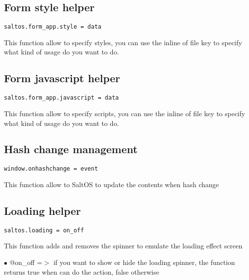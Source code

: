 \documentclass[a4paper]{book}
\begin{document}
\hypertarget{toc360}{}
\subsection{Form style helper}

\begin{lstlisting}
saltos.form_app.style = data
\end{lstlisting}

This function allow to specify styles, you can use the inline of file key to specify
what kind of usage do you want to do.

\hypertarget{toc361}{}
\subsection{Form javascript helper}

\begin{lstlisting}
saltos.form_app.javascript = data
\end{lstlisting}

This function allow to specify scripts, you can use the inline of file key to specify
what kind of usage do you want to do.

\hypertarget{toc362}{}
\subsection{Hash change management}

\begin{lstlisting}
window.onhashchange = event
\end{lstlisting}

This function allow to SaltOS to update the contents when hash change

\hypertarget{toc363}{}
\subsection{Loading helper}

\begin{lstlisting}
saltos.loading = on_off
\end{lstlisting}

This function adds and removes the spinner to emulate the loading effect screen

\begin{compactitem}
\item[\color{myblue}$\bullet$] @on\_off =$>$ if you want to show or hide the loading spinner, the function returns
true when can do the action, false otherwise
\end{compactitem}
\end{document}
